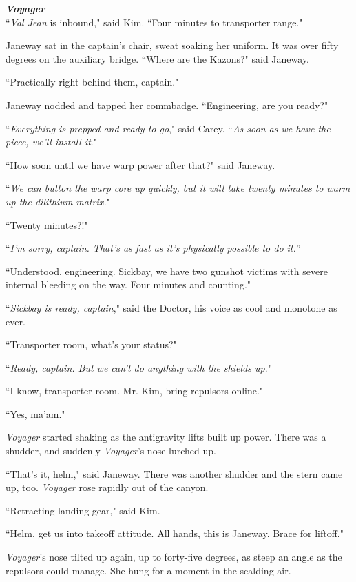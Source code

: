 \documentclass[twoside,letterpaper,12pt]{memoir}
\begin{document}
\noindent\textit{\textbf{Voyager}}\\

``\textit{Val Jean} is inbound," said Kim. ``Four minutes to transporter range."

Janeway sat in the captain's chair, sweat soaking her uniform. It was over fifty degrees on the auxiliary bridge. ``Where are the Kazons?" said Janeway.

``Practically right behind them, captain."

Janeway nodded and tapped her commbadge. ``Engineering, are you ready?"

``\textit{Everything is prepped and ready to go}," said Carey. ``\textit{As soon as we have the piece, we'll install it}."

``How soon until we have warp power after that?" said Janeway.

``\textit{We can button the warp core up quickly, but it will take twenty minutes to warm up the dilithium matrix.}"

``Twenty minutes?!"

``\textit{I'm sorry, captain. That's as fast as it's physically possible to do it.}”

``Understood, engineering. Sickbay, we have two gunshot victims with severe internal bleeding on the way. Four minutes and counting."

``\textit{Sickbay is ready, captain}," said the Doctor, his voice as cool and monotone as ever.

``Transporter room, what's your status?"

``\textit{Ready, captain. But we can't do anything with the shields up}."

``I know, transporter room. Mr. Kim, bring repulsors online."

``Yes, ma'am."

\textit{Voyager} started shaking as the antigravity lifts built up power. There was a shudder, and suddenly \textit{Voyager}'s nose lurched up.

``That's it, helm," said Janeway. There was another shudder and the stern came up, too. \textit{Voyager} rose rapidly out of the canyon.

``Retracting landing gear," said Kim.

``Helm, get us into takeoff attitude. All hands, this is Janeway. Brace for liftoff."

\textit{Voyager}'s nose tilted up again, up to forty-five degrees, as steep an angle as the repulsors could manage. She hung for a moment in the scalding air.
\end{document}
